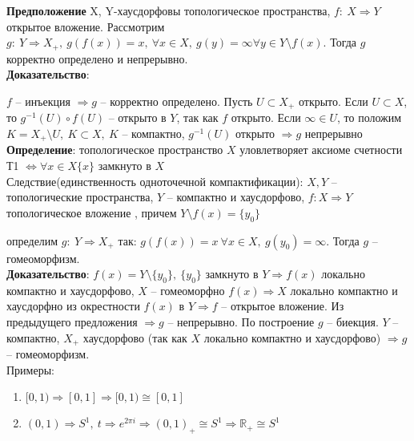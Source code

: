 	\textbf{Предположение} X, Y-хаусдорфовы топологическое пространства, $f:\ X\Rightarrow Y$ открытое вложение. Рассмотрим $g:\ Y\Rightarrow X_{+},\ g(f(x))=x,\ \forall x\in X,\ g(y) = \infty \forall y\in Y\setminus f(x)$. Тогда $g$ корректно определено и непрерывно.\\
	\textbf{Доказательство}:
	\begin{figure}[h]
	\end{figure}
	$f$ -- инъекция $\Rightarrow g$ -- корректно определено. Пусть $U\subset X_{+}$ открыто. Если $U\subset X$, то $g^{-1}(U) \circ f(U)$ -- открыто в $Y$, так как $f$ открыто. Если $\infty\in U$, то положим $K=X_{+}\setminus U,\ K\subset X,\ K$ -- компактно, $g^{-1}(U)$ открыто $\Rightarrow g$ непрерывно\\
	\textbf{Определение}: топологическое пространство $X$ уловлетворяет аксиоме счетности Т1 $\Leftrightarrow \forall x\in X \{x\}$ замкнуто в $X$\\
	Следствие(единственность одноточечной компактификации): $X, Y$ -- топологические пространства, $Y$ -- компактно и хаусдорфово, $f: X\Rightarrow Y$ топологическое вложение , причем $Y\setminus f(x)=\{y_0\}$
	\begin{figure}[h]
	\end{figure}
	определим $g:\ Y\Rightarrow X_{+}$ так: $g(f(x)) = x\ \forall x\in X,\ g(y_0) = \infty$. Тогда $g$ -- гомеоморфизм.\\
	\textbf{Доказательство}: $f(x) = Y\setminus \{y_0\},\ \{y_0\}$ замкнуто в $Y \Rightarrow f(x)$ локально компактно и хаусдорфово, $X$ -- гомеоморфно $f(x) \Rightarrow X$ локально компактно и хаусдорфно из окрестности $f(x)$ в $Y \Rightarrow f$ -- открытое вложение. Из предыдущего предложения $\Rightarrow g$ -- непрерывно. По построение $g$ -- биекция. $Y$ -- компактно, $X_{+}$ хаусдорфово (так как $X$ локально компактно и хаусдорфово) $\Rightarrow g$ -- гомеоморфизм.\\
	Примеры:
	\begin{enumerate}
		\item 
		$[0,1) \Rightarrow [0,1] \Rightarrow [0,1) \cong [0,1]$
		\item 
		$(0,1) \Rightarrow S^1,\ t \Rightarrow e^{2\pi i} \Rightarrow {(0,1)}_{+} \cong S^1 \Rightarrow {\mathbb{R}}_{+}\cong S^1$
	\end{enumerate}

\newpage
